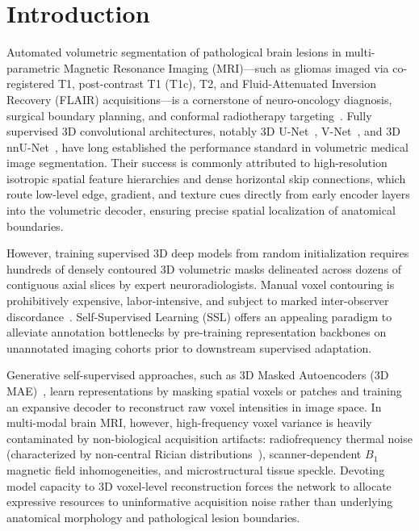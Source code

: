 \documentclass{article}
\begin{document}
\section{Introduction}
\label{sec:introduction}

Automated volumetric segmentation of pathological brain lesions in multi-parametric Magnetic Resonance Imaging (MRI)---such as gliomas imaged via co-registered T1, post-contrast T1 (T1c), T2, and Fluid-Attenuated Inversion Recovery (FLAIR) acquisitions---is a cornerstone of neuro-oncology diagnosis, surgical boundary planning, and conformal radiotherapy targeting~\citep{brats2024,menze2014multimodal}. Fully supervised 3D convolutional architectures, notably 3D U-Net~\citep{ronneberger2015u,cciccek20163d}, V-Net~\citep{milletari2016vnet}, and 3D nnU-Net~\citep{isensee2021nnunet}, have long established the performance standard in volumetric medical image segmentation. Their success is commonly attributed to high-resolution isotropic spatial feature hierarchies and dense horizontal skip connections, which route low-level edge, gradient, and texture cues directly from early encoder layers into the volumetric decoder, ensuring precise spatial localization of anatomical boundaries.

However, training supervised 3D deep models from random initialization requires hundreds of densely contoured 3D volumetric masks delineated across dozens of contiguous axial slices by expert neuroradiologists. Manual voxel contouring is prohibitively expensive, labor-intensive, and subject to marked inter-observer discordance~\citep{menze2014multimodal}. Self-Supervised Learning (SSL) offers an appealing paradigm to alleviate annotation bottlenecks by pre-training representation backbones on unannotated imaging cohorts prior to downstream supervised adaptation.

Generative self-supervised approaches, such as 3D Masked Autoencoders (3D MAE)~\citep{he2022masked,feichtenhofer2022masked}, learn representations by masking spatial voxels or patches and training an expansive decoder to reconstruct raw voxel intensities in image space. In multi-modal brain MRI, however, high-frequency voxel variance is heavily contaminated by non-biological acquisition artifacts: radiofrequency thermal noise (characterized by non-central Rician distributions~\citep{gudbjartsson1995rician}), scanner-dependent $B_1$ magnetic field inhomogeneities, and microstructural tissue speckle. Devoting model capacity to 3D voxel-level reconstruction forces the network to allocate expressive resources to uninformative acquisition noise rather than underlying anatomical morphology and pathological lesion boundaries.
\end{document}

